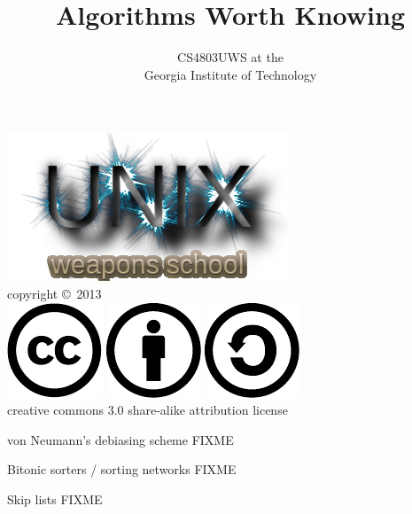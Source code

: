 \documentclass[mathserif,xcolor={dvipsnames,table}]{beamer}
\title{\textbf{Algorithms Worth Knowing}}
\date{}
\author{CS4803UWS at the\\
Georgia Institute of Technology
}
\begin{document}
\begin{frame}
\titlepage
\begin{center}
\includegraphics[scale=0.33]{images/uws.png}\\
\vspace{.1in}
\tiny{copyright \copyright\ 2013}\\
\includegraphics[scale=.25]{images/cc-logo.pdf}
\includegraphics[scale=.25]{images/cc-new.pdf}
\includegraphics[scale=.25]{images/cc-share.pdf}\\
\tiny{creative commons 3.0 share-alike attribution license}
\end{center}
\end{frame}

\begin{frame}{von Neumann's debiasing scheme}
\huge FIXME
\end{frame}

\begin{frame}{Bitonic sorters / sorting networks}
\huge FIXME
\end{frame}

\begin{frame}{Skip lists}
\huge FIXME
\end{frame}
\end{document}
